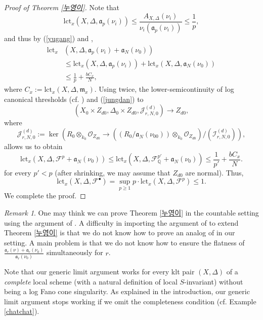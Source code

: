 \documentclass[a4paper,12pt]{amsart}
\theoremstyle{definition} %
\theoremstyle{remark}
\newtheorem{remark}[theorem]{Remark}
\numberwithin{equation}{section}
\begin{document}
\begin{proof}[Proof of Theorem \ref{누영이}]
\smallskip

Note that
$$ \mathrm{lct}_x(X,\Delta,\mathfrak{a}_{p}(\nu_i))\le \frac{A_{X,\Delta}(\nu_i)}{\nu_i(\mathfrak{a}_{p}(\nu_i))}\le \frac{1}{p},$$
and thus by (\ref{yugang}) and \cite[Lemma 3.14]{BLXZ25},
\begin{equation} \label{jungdan}
\begin{aligned}
\mathrm{lct}_x&(X,\Delta,\mathfrak{a}_{p}(\nu_i)+\mathfrak{a}_N(\nu_0))
\\ &\le \mathrm{lct}_x(X,\Delta,\mathfrak{a}_{p}(\nu_i))+\mathrm{lct}_x(X,\Delta,\mathfrak{a}_N(\nu_0))
\\ &\le \frac{1}{p}+\frac{bC_x}{N},
\end{aligned}
\end{equation}
where $C_x:=\mathrm{lct}_x(X,\Delta,\mathfrak{m}_x)$. Using \cite[Lemma 2.14 iii)]{dFEM11} twice, the lower-semicontinuity of log canonical thresholds (cf. \cite[Proposition 10(2)]{BL21}) and (\ref{jungdan}) to 
$$(X_{0}\times Z_{d0},\Delta_{0}\times Z_{d0},\mathcal{J}^{(d)}_{r,N,0})\to Z_{d0},$$ where
$$ \mathcal{J}^{(d)}_{r,N,0}:=\ker\left(R_{0}\otimes_{k_0}\mathcal{O}_{Z_{d0}}\to ((R_{0}/\mathfrak{a}_N(\nu_{00}))\otimes_{k_0} \mathcal{O}_{Z_{d0}})/(\mathcal{I}^{(d)}_{r,N,0})\right),$$
allows us to obtain
$$\mathrm{lct}_x(X,\Delta,\mathcal{F}^{p}+\mathfrak{a}_N(\nu_0)) \le \mathrm{lct}_x(X,\Delta,\mathcal{F}^{p'}_{\mathbb{Q}}+\mathfrak{a}_N(\nu_0))\le \frac{1}{p'}+\frac{bC_x}{N}.$$
for every $p'<p$ (after shrinking, we may assume that $Z_{d0}$ are normal). Thus,
$$ \mathrm{lct}_x(X,\Delta,\mathcal{F}^{\bullet})=\sup_{p\ge 1}p\cdot \mathrm{lct}_x(X,\Delta,\mathcal{F}^p)\le 1.$$
We complete the proof.
\end{proof}

\begin{remark}
One may think we can prove Theorem \ref{누영이} in the countable setting using the argument of \cite{KL26}. A difficulty in importing the argument of \cite{KL26} to extend Theorem \ref{누영이} is that we do not know how to prove an analog of \cite[Lemma 3.1]{KL26} in our setting. A main problem is that we do not know how to ensure the flatness of $\frac{\mathfrak{a}_{r}(\nu)+\mathfrak{a}_r(\nu_0)}{\mathfrak{a}_r(\nu_0)}$ simultaneously for $r$.

\smallskip

Note that our generic limit argument works for every klt pair $(X,\Delta)$ of a \emph{complete} local scheme (with a natural definition of local $S$-invariant) without being a log Fano cone singularity. As explained in the introduction, our generic limit argument stops working if we omit the completeness condition (cf. Example \ref{chatchat}).
\end{remark}
\end{document}
